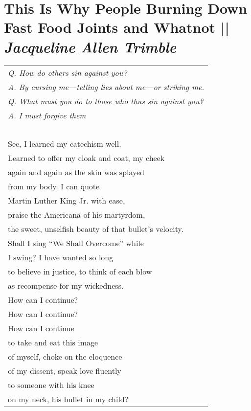 \section[This Is Why People Burning Down Fast Food Joints and Whatnot]{This Is Why People Burning Down Fast Food Joints and Whatnot || \emph{Jacqueline Allen Trimble} \hspace*{\fill}  \thepage}
\vfill
\begin{center}
\begin{tabular}{l}
    \emph{Q. How do others sin against you?}\\
    \emph{A. By cursing me—telling lies about me—or striking me.}\\
    \emph{Q. What must you do to those who thus sin against you?}\\
    \emph{A. I must forgive them}\\
    
    \-\ \\See, I learned my catechism well.\\
    Learned to offer my cloak and coat, my cheek\\
    again and again as the skin was splayed\\
    from my body. I can quote\\
    Martin Luther King Jr. with ease,\\
    praise the Americana of his martyrdom,\\
    the sweet, unselfish beauty of that bullet’s velocity.\\
    Shall I sing “We Shall Overcome” while\\
    I swing? I have wanted so long\\
    to believe in justice, to think of each blow\\
    as recompense for my wickedness.\\
    How can I continue?\\
    How can I continue?\\
    How can I continue\\
    to take and eat this image\\
    of myself, choke on the eloquence\\
    of my dissent, speak love fluently\\
    to someone with his knee\\
    on my neck, his bullet in my child?
\end{tabular}
\end{center}
\vfill